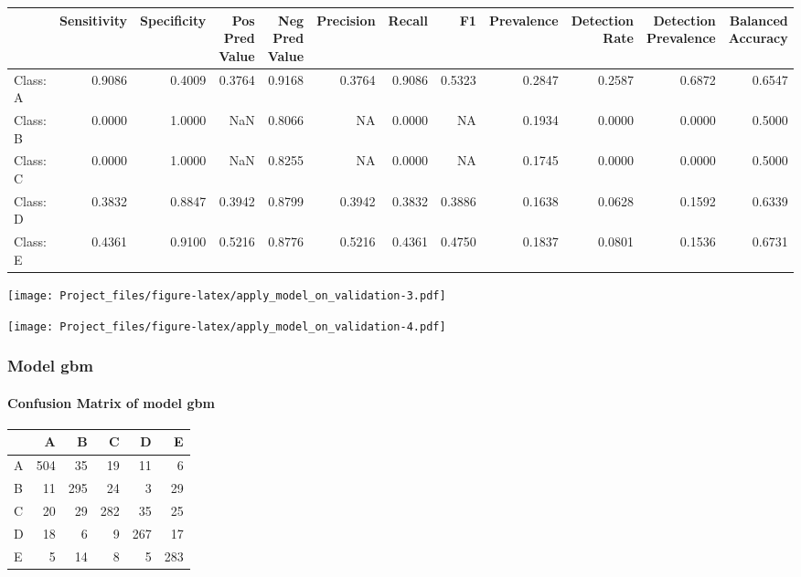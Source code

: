 \documentclass[]{article}
\let\oldparagraph\paragraph
\renewcommand{\paragraph}[1]{\oldparagraph{#1}\mbox{}}
\begin{document}
\begin{tabular}{l|r|r|r|r|r|r|r|r|r|r|r}
\hline
  & Sensitivity & Specificity & Pos Pred Value & Neg Pred Value & Precision & Recall & F1 & Prevalence & Detection Rate & Detection Prevalence & Balanced Accuracy\\
\hline
Class: A & 0.9086 & 0.4009 & 0.3764 & 0.9168 & 0.3764 & 0.9086 & 0.5323 & 0.2847 & 0.2587 & 0.6872 & 0.6547\\
\hline
Class: B & 0.0000 & 1.0000 & NaN & 0.8066 & NA & 0.0000 & NA & 0.1934 & 0.0000 & 0.0000 & 0.5000\\
\hline
Class: C & 0.0000 & 1.0000 & NaN & 0.8255 & NA & 0.0000 & NA & 0.1745 & 0.0000 & 0.0000 & 0.5000\\
\hline
Class: D & 0.3832 & 0.8847 & 0.3942 & 0.8799 & 0.3942 & 0.3832 & 0.3886 & 0.1638 & 0.0628 & 0.1592 & 0.6339\\
\hline
Class: E & 0.4361 & 0.9100 & 0.5216 & 0.8776 & 0.5216 & 0.4361 & 0.4750 & 0.1837 & 0.0801 & 0.1536 & 0.6731\\
\hline
\end{tabular}

\endgroup{}

\texttt{[image: Project\_files/figure-latex/apply\_model\_on\_validation-3.pdf]}

\texttt{[image: Project\_files/figure-latex/apply\_model\_on\_validation-4.pdf]}

\subsubsection{Model gbm}\label{model-gbm}

\paragraph{Confusion Matrix of model
gbm}\label{confusion-matrix-of-model-gbm}

\begin{table}[H]
\centering
\begin{tabular}{l|r|r|r|r|r}
\hline
  & A & B & C & D & E\\
\hline
A & 504 & 35 & 19 & 11 & 6\\
\hline
B & 11 & 295 & 24 & 3 & 29\\
\hline
C & 20 & 29 & 282 & 35 & 25\\
\hline
D & 18 & 6 & 9 & 267 & 17\\
\hline
E & 5 & 14 & 8 & 5 & 283\\
\hline
\end{tabular}
\end{table}
\end{document}
